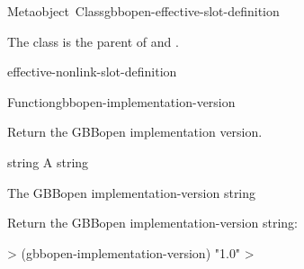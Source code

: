 \documentclass[10pt,twoside,english,pdftex]{article}
\begin{document}
\begin{functiondoc}{Metaobject~Class}{gbbopen-effective-slot-definition}{}
%

\fnsyntax

\fnpackage {}

\fnmodule {}

\fndescription The class  is
the parent  of
 and
.
 
\begin{alsos}{effective-nonlink-slot-definition}
\end{alsos}

\end{functiondoc}


\begin{functiondoc}{Function}{gbbopen-implementation-version}{\noargs{}
    }
%
%

\fnsyntax

\fnpurpose Return the GBBopen implementation version.

\fnpackage {}

\fnmodule {}

\fnargs
\begin{args}{string}
\arg[string] A string
\end{args}

\fnreturns The GBBopen implementation-version string

\fnexample
Return the GBBopen implementation-version string:
%
\W\supp
\begin{example}
  > (gbbopen-implementation-version)
  "1.0"
  >
\end{example}

\end{functiondoc}

\end{document}
